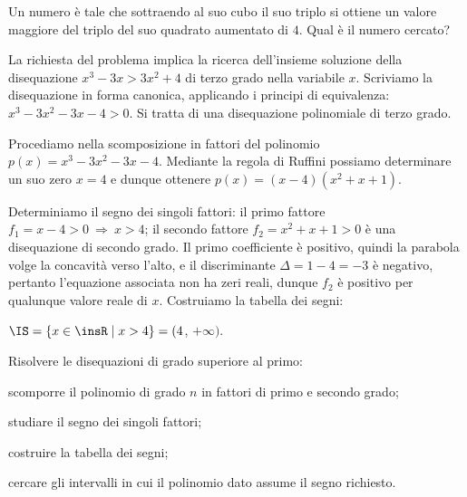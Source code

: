 \begin{exrig}
\begin{esempio}
Un numero è tale che sottraendo al suo cubo il suo triplo si ottiene un valore maggiore del triplo del suo quadrato aumentato di $4$. Qual è il numero cercato?

La richiesta del problema implica la ricerca dell'insieme soluzione della disequazione $x^3-3x>3x^2+4$ di terzo grado nella variabile $x$. Scriviamo la disequazione in forma canonica, applicando i principi di equivalenza: $x^3-3x^2-3x-4>0$. Si tratta di una disequazione polinomiale di terzo grado.

Procediamo nella scomposizione in fattori del polinomio $p(x)=x^3-3x^2-3x-4$. Mediante la regola di Ruffini possiamo determinare un suo zero $x=4$ e dunque ottenere $p(x)=(x-4)(x^2+x+1)$.

Determiniamo il segno dei singoli fattori: il primo fattore $f_1=x-4>0\:\Rightarrow\: x>4$; il secondo fattore $f_2=x^2+x+1>0$ è una disequazione di secondo grado. Il primo coefficiente è positivo, quindi la parabola volge la concavità verso l'alto, e il discriminante $\Delta =1-4=-3$ è negativo, pertanto l'equazione associata non ha zeri reali, dunque $f_2$ è positivo per qualunque valore reale di $x$. Costruiamo la tabella dei segni:
\begin{center}
 
\end{center}
$\IS=\{x\in \insR \mid x>4\}=(4$, $+\infty)$.
\end{esempio}
\end{exrig}

\begin{procedura}
Risolvere le disequazioni di grado superiore al primo:
\begin{enumeratea}
\item scomporre il polinomio di grado $n$ in fattori di primo e secondo grado;
\item studiare il segno dei singoli fattori;
\item costruire la tabella dei segni;
\item cercare gli intervalli in cui il polinomio dato assume il segno richiesto.
\end{enumeratea}
\end{procedura}

